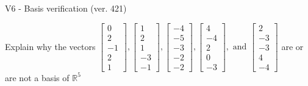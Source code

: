 \begin{exercise}
  \begin{exerciseTitle}V6 - Basis verification (ver. 421)\end{exerciseTitle}
  \begin{exerciseStatement}
    Explain why the vectors \(\left[\begin{array}{r}
0 \\
2 \\
-1 \\
2 \\
1
\end{array}\right] , \left[\begin{array}{r}
1 \\
2 \\
1 \\
-3 \\
-1
\end{array}\right] , \left[\begin{array}{r}
-4 \\
-5 \\
-3 \\
-2 \\
-2
\end{array}\right] , \left[\begin{array}{r}
4 \\
-4 \\
2 \\
0 \\
-3
\end{array}\right] , \text{ and } \left[\begin{array}{r}
2 \\
-3 \\
-3 \\
4 \\
-4
\end{array}\right]\) are or are not a basis of \(\mathbb{R}^5\)	



\end{exerciseStatement}
\end{exercise}
